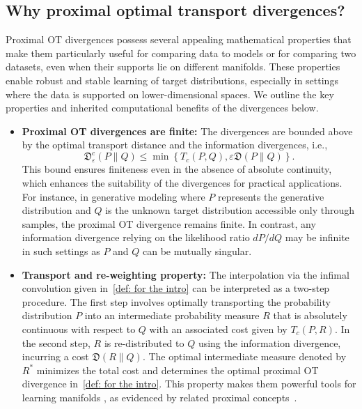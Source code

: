 \documentclass{amsart}
\newcommand{\rb}[1]{#1} %
\theoremstyle{definition}
\theoremstyle{remark}
\numberwithin{equation}{section}
\begin{document}
\subsection{Why proximal optimal transport divergences?}

Proximal OT divergences possess several appealing mathematical properties that make them particularly useful for comparing data to models or for comparing two datasets, even when their supports lie on different manifolds. These properties enable robust and stable learning of target distributions, especially in settings where the data is supported on lower-dimensional spaces. \rb{We outline the key properties and inherited computational benefits of the divergences below.}
\medskip
\begin{itemize}
\item{\bf  Proximal OT divergences are finite:} The divergences are bounded above by the optimal transport distance and the information divergences, i.e., 
\begin{equation}
\label{eq:upper.bound_intro_0}
\mathfrak{D}^c_{\varepsilon}(P\|Q)  \le \min \left\{  
T_{c}(P,Q),  \varepsilon \mathfrak{D}(P\|Q) \right\}.
\end{equation}
This bound ensures finiteness even in the absence of absolute continuity, which enhances the suitability of the divergences for practical applications. For instance, in generative modeling where $P$ represents the generative distribution and $Q$ is the unknown target distribution accessible only through samples, the proximal OT divergence remains finite. In contrast, any information divergence relying on the likelihood ratio $dP/dQ$ may be infinite in such settings as $P$ and $Q$ can be mutually singular.
\medskip
\item{\bf Transport and re-weighting property:} The interpolation via the infimal convolution given in~\eqref{def: for the intro} can be interpreted as a two-step procedure. The first step involves optimally transporting the probability distribution $P$ into an intermediate probability measure $R$ that is absolutely continuous with respect to $Q$ with an associated cost given by $T_c(P,R)$. In the second step, $R$ is re-distributed to $Q$ using the information divergence, incurring a cost $\mathfrak{D}(R\|Q)$. The optimal intermediate measure denoted by $R^*$ minimizes the total cost and determines the optimal proximal OT divergence in~\eqref{def: for the intro}. This property makes them powerful tools for learning manifolds \cite{loaizaganem2024deep_manifold}, as evidenced by related proximal concepts~\cite{birrell2022f, birrell2023adversarially, pidstrigach2022score, zhang2024wasserstein}.

\end{itemize}
\end{document}
